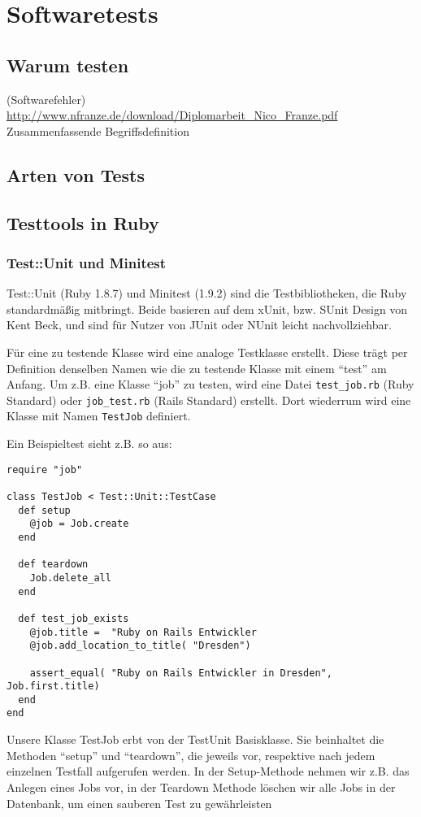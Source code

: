 \section{Softwaretests}

\subsection{Warum testen}

(Softwarefehler) \url{http://www.nfranze.de/download/Diplomarbeit_Nico_Franze.pdf}
  Zusammenfassende Begriffsdefinition

\subsection{Arten von Tests}

\subsection{Testtools in Ruby}
\subsubsection{Test::Unit und Minitest}
Test::Unit (Ruby 1.8.7) und Minitest (1.9.2) sind die Testbibliotheken, die Ruby standardmäßig mitbringt. Beide basieren auf dem xUnit, bzw. SUnit Design von Kent Beck, und sind für Nutzer von JUnit oder NUnit leicht nachvollziehbar.

Für eine zu testende Klasse wird eine analoge Testklasse erstellt. Diese trägt per Definition denselben Namen wie die zu testende Klasse mit einem "`test"' am Anfang. Um z.B. eine Klasse "`job"' zu testen, wird eine Datei \texttt{test\_job.rb} (Ruby Standard) oder \texttt{job\_test.rb} (Rails Standard) erstellt. Dort wiederrum wird eine Klasse mit Namen \texttt{TestJob} definiert. 

Ein Beispieltest sieht z.B. so aus:
\begin{lstlisting}
require "job"

class TestJob < Test::Unit::TestCase
  def setup
    @job = Job.create
  end
  
  def teardown
    Job.delete_all
  end
  
  def test_job_exists
    @job.title =  "Ruby on Rails Entwickler
    @job.add_location_to_title( "Dresden")
    
    assert_equal( "Ruby on Rails Entwickler in Dresden",  Job.first.title)
  end
end
\end{lstlisting}
Unsere Klasse TestJob erbt von der TestUnit Basisklasse. Sie beinhaltet die Methoden "`setup"' und "`teardown"', die jeweils vor, respektive nach jedem einzelnen Testfall aufgerufen werden.
In der Setup-Methode nehmen wir z.B. das Anlegen eines Jobs vor, in der Teardown Methode löschen wir alle Jobs in der Datenbank, um einen sauberen Test zu gewährleisten

